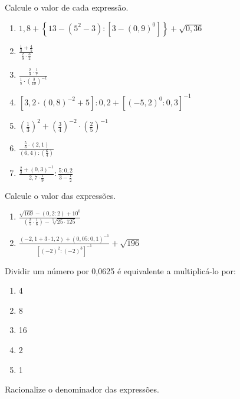 	\item Calcule o valor de cada expressão.
	\begin{enumerate}
		\item $\displaystyle{
			1,8 + \left\{ 13 - (5^2-3):\left[3-(0,9)^0\right]\right\}+\sqrt{0,36}
			}$
		\item $\displaystyle{
			\frac{\displaystyle\frac{1}{3}+\frac{4}{5}}{\displaystyle\frac{2}{9}\cdot\frac{3}{2}}		
		}$
		\item $\displaystyle{
			\frac{\displaystyle\frac{2}{3}\cdot\frac{1}{7}}{\displaystyle\frac{1}{5}\cdot\left(\frac{3}{10}\right)^{-1}}		
		}$
		\item $\left[3,2\cdot(0,8)^{-2}+5\right]:0,2+\left[(-5,2)^0:0,3\right]^{-1}$
		\item $\displaystyle{
			\left(\frac{1}{3}\right)^{2} + \left(\frac{3}{4}\right)^{-2} \cdot \left(\frac{2}{5}\right)^{-1}	
		}$
		\item $\frac{\displaystyle\frac{5}{3}\cdot(2,1)}{\displaystyle(6,4):\displaystyle\left(\frac{6}{4}\right)}$
		\item $\displaystyle\frac{\displaystyle\frac{2}{3}+ (0,3)^{-1}}{2,7\cdot\displaystyle\frac{1}{9}} : \frac{5:0,2}{3-\displaystyle\frac{1}{2}}$
	\end{enumerate}
	\item Calcule o valor das expressões.
	\begin{enumerate}
		\item $\displaystyle\frac{\sqrt{169}-(0,2:2)+10^0} {\left( \displaystyle\frac{2}{5} \cdot \frac{1}{6}\right)-\sqrt[5]{25 \cdot 125}}$ 
		\item $\displaystyle\frac{(-2,1+3\cdot 1,2) + (0,05:0,1)^{-1}}{\left[(-2)^2:(-2)^3\right]^{-1}}+\sqrt{196}$
	\end{enumerate}
	\item Dividir um número por 0,0625 é equivalente a multiplicá-lo por:
	\begin{multicols}{5}
	\begin{enumerate}
		\item 4
		\item 8
		\item 16
		\item 2
		\item 1
	\end{enumerate}
	\end{multicols}
	\item Racionalize o denominador das expressões.
